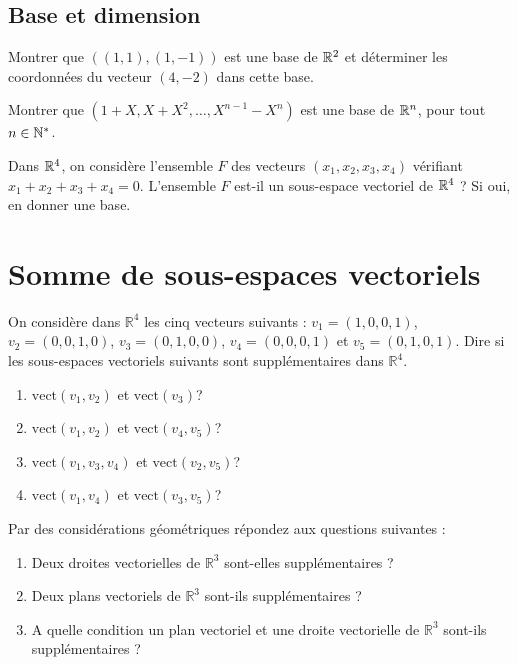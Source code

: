 \documentclass{book}
\begin{document}
\subsection{Base et dimension}
\begin{Exercice}[dans $\R^2$]
Montrer que $\left((1,1),(1,-1)\right)$ est une base de $\R^2$ et déterminer les coordonnées du vecteur $(4,-2)$ dans cette base. 
\end{Exercice}

\begin{Exercice}[**, dans $\R^n$]
Montrer que $\left(1+X,X+X^2,\dots, X^{n-1}-X^n\right)$ est une base de $\R^n$, pour tout $n\in\mathbb{N}^*$. 
\end{Exercice}
\begin{Exercice}
Dans $\mathbb{R}^4$, on considère l'ensemble $F$ des vecteurs $(x_1, x_2, x_3, x_4)$ vérifiant $x_1 + x_2 + x_3 + x_4 = 0$. L'ensemble $F$
est-il un sous-espace vectoriel de $\mathbb{R}^4$ ? Si oui, en donner une base.
\end{Exercice}
\section{Somme de sous-espaces vectoriels}
\begin{Exercice}
On considère dans $\mathbb R^4$ les cinq vecteurs suivants : $v_1=(1,0,0,1)$, $v_2=(0,0,1,0)$, $v_3=(0,1,0,0)$, $v_4=(0,0,0,1)$ et $v_5=(0,1,0,1)$. Dire si les sous-espaces vectoriels suivants sont supplémentaires dans $\mathbb R^4$.
\begin{enumerate}
\item $\textrm{vect}(v_1,v_2)$ et $\textrm{vect}(v_3)$?
\item $\textrm{vect}(v_1,v_2)$ et $\textrm{vect}(v_4,v_5)$?
\item $\textrm{vect}(v_1,v_3,v_4)$ et $\textrm{vect}(v_2,v_5)$?
\item $\textrm{vect}(v_1,v_4)$ et $\textrm{vect}(v_3,v_5)$?
\end{enumerate}
\end{Exercice}

\begin{Exercice}
Par des considérations géométriques répondez aux questions suivantes :
\begin{enumerate}

\item  Deux droites vectorielles de $\mathbb R^3$
sont-elles supplémentaires ?
\item Deux plans vectoriels de $\mathbb R^3$
sont-ils supplémentaires ?
\item A quelle condition un plan vectoriel et une droite vectorielle de $\mathbb R^3$
sont-ils supplémentaires ?
\end{enumerate}
\end{Exercice}
\end{document}
